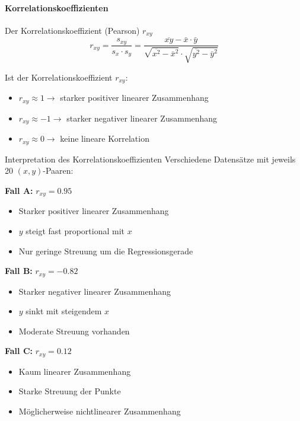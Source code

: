 \paragraph{Korrelationskoeffizienten}

\begin{definition}{Der Korrelationskoeffizient (Pearson) $r_{xy}$}\\
$$r_{xy} = \frac{s_{xy}}{s_x \cdot s_y} = \frac{\overline{xy} - \bar{x} \cdot \bar{y}}{\sqrt{\overline{x^2} - \bar{x}^2} \cdot \sqrt{\overline{y^2} - \bar{y}^2}}$$

Ist der Korrelationskoeffizient $r_{xy}$:
\begin{itemize}
  \item $r_{xy} \approx 1 \rightarrow$ starker positiver linearer Zusammenhang
  \item $r_{xy} \approx -1 \rightarrow$ starker negativer linearer Zusammenhang
  \item $r_{xy} \approx 0 \rightarrow$ keine lineare Korrelation
\end{itemize}
\end{definition}

\begin{example2}{Interpretation des Korrelationskoeffizienten}
Verschiedene Datensätze mit jeweils 20 $(x,y)$-Paaren:

\textbf{Fall A:} $r_{xy} = 0.95$
\begin{itemize}
    \item Starker positiver linearer Zusammenhang
    \item $y$ steigt fast proportional mit $x$
    \item Nur geringe Streuung um die Regressionsgerade
\end{itemize}

\textbf{Fall B:} $r_{xy} = -0.82$
\begin{itemize}
    \item Starker negativer linearer Zusammenhang
    \item $y$ sinkt mit steigendem $x$
    \item Moderate Streuung vorhanden
\end{itemize}

\textbf{Fall C:} $r_{xy} = 0.12$
\begin{itemize}
    \item Kaum linearer Zusammenhang
    \item Starke Streuung der Punkte
    \item Möglicherweise nichtlinearer Zusammenhang
\end{itemize}
\end{example2}



